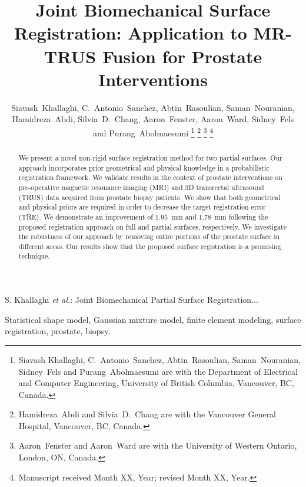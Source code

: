 \documentclass[journal]{IEEEtran}
\begin{document}
\title{Joint Biomechanical Surface Registration: Application to MR-TRUS Fusion for Prostate Interventions}

\author{Siavash~Khallaghi, C.~Antonio~Sanchez, Abtin~Rasoulian, Saman~Nouranian, Hamidreza~Abdi, Silvia~D.~Chang, Aaron~Fenster, Aaron~Ward, Sidney~Fels and Purang~Abolmaesumi%
\thanks{Siavash Khallaghi, C.~Antonio~Sanchez, Abtin~Rasoulian, Saman~Nouranian, Sidney~Fels and Purang~Abolmaesumi are with the Department of Electrical and Computer Engineering, University of British Columbia, Vancouver, BC, Canada.}%
\thanks{Hamidreza~Abdi and Silvia~D.~Chang are with the Vancouver General Hospital, Vancouver, BC, Canada.}%
\thanks{Aaron~Fenster and Aaron~Ward are with the University of Western Ontario, London, ON, Canada.}%
\thanks{Manuscript received Month XX, Year; revised Month XX, Year.}}

%
{S. Khallaghi \MakeLowercase{\textit{et al.}}: Joint Biomechanical Partial Surface Registration...}

\maketitle

\begin{abstract}
We present a novel non-rigid surface registration method for two partial surfaces. Our approach incorporates prior geometrical and physical knowledge in a probabilistic registration framework. We validate results in the context of prostate interventions on pre-operative magnetic resonance imaging (MRI) and 3D transrectal ultrasound (TRUS) data acquired from prostate biopsy patients. We show that both geometrical and physical priors are required in order to decrease the target registration error (TRE). We demonstrate an improvement of $1.95$~mm and $1.78$~mm following the proposed registration approach on full and partial surfaces, respectively. We investigate the robustness of our approach by removing entire portions of the prostate surface in different areas. Our results show that the proposed surface registration is a promising technique.
\end{abstract}

\begin{IEEEkeywords}
Statistical shape model, Gaussian mixture model, finite element modeling, surface registration, prostate, biopsy.
\end{IEEEkeywords}
\end{document}
